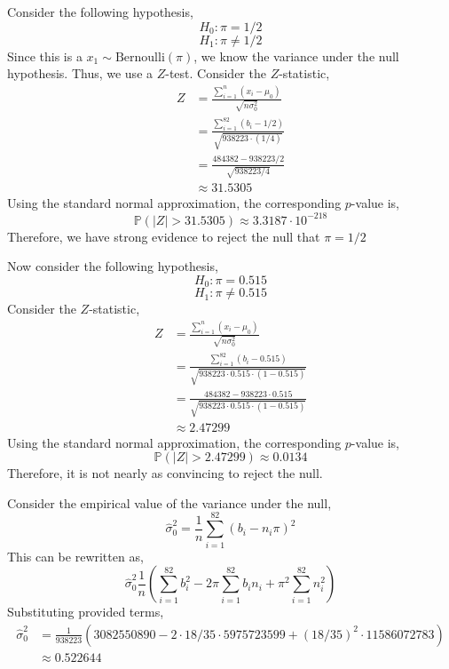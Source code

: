 \documentclass[12pt,twoside]{article}
\begin{document}
\begin{problems}
\begin{problemparts}
\end{problemparts}

\newpage

\problem  %

\begin{problemparts}

\problempart  %

Consider the following hypothesis,
$$ H_0 : \pi = 1/2 $$
$$ H_1 : \pi \neq 1/2 $$
Since this is a $x_1 \sim \mathrm{Bernoulli}(\pi)$, we know the variance
under the null hypothesis. Thus, we use a $Z$-test. Consider the
$Z$-statistic,
\begin{align*}
    Z &= \frac{\sum_{i = 1}^n (x_i - \mu_0)}{\sqrt{n \sigma_0^2}} \\
    &= \frac{\sum_{i = 1}^{82} (b_i - 1/2)}{\sqrt{938223 \cdot (1/4)}} \\
    &= \frac{484382 - 938223/2}{\sqrt{938223/4}} \\
    &\approx 31.5305
\end{align*}
Using the standard normal approximation, the corresponding $p$-value is,
$$ \mathbb{P}(|Z| > 31.5305) \approx \boxed{3.3187 \cdot 10^{-218}} $$
Therefore, we have strong evidence to reject the null that $\pi = 1/2$

\problempart  %

Now consider the following hypothesis,
$$ H_0 : \pi = 0.515 $$
$$ H_1 : \pi \neq 0.515 $$
Consider the $Z$-statistic,
\begin{align*}
    Z &= \frac{\sum_{i = 1}^n (x_i - \mu_0)}{\sqrt{n \sigma_0^2}} \\
    &= \frac{\sum_{i = 1}^{82} (b_i - 0.515)}{\sqrt{938223 \cdot 0.515 \cdot
    (1 - 0.515)}} \\
    &= \frac{484382 - 938223 \cdot 0.515}{\sqrt{938223 \cdot 0.515 \cdot (1 -
    0.515)}} \\
    &\approx 2.47299
\end{align*}
Using the standard normal approximation, the corresponding $p$-value is,
$$ \mathbb{P}(|Z| > 2.47299) \approx \boxed{0.0134} $$
Therefore, it is not nearly as convincing to reject the null.

\problempart  %

Consider the empirical value of the variance under the null,
$$ \hat{\sigma}_0^2 = \frac{1}{n} \sum_{i = 1}^{82} (b_i - n_i \pi)^2 $$
This can be rewritten as,
$$ \hat{\sigma}_0^2\frac{1}{n}\left(\sum_{i = 1}^{82} b_i^2 - 2 \pi \sum_{i =
1}^{82} b_i n_i + \pi^2 \sum_{i = 1}^{82} n_i^2\right) $$
Substituting provided terms,
\begin{align*}
    \hat{\sigma}_0^2 &= \frac{1}{938223}\left(3082550890 - 2 \cdot 18/35
    \cdot 5975723599 + (18/35)^2 \cdot 11586072783\right) \\
    &\approx \boxed{0.522644}
\end{align*}


\end{problemparts}
\end{problems}
\end{document}
